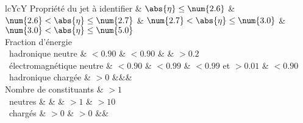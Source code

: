 \begin{tabularx}{\textwidth}{lcYcY}
\toprule
Propriété du jet à identifier & $\abs{\eta}\leq\num{2.6}$ & $\num{2.6}<\abs{\eta}\leq\num{2.7}$ & $\num{2.7}<\abs{\eta}\leq\num{3.0}$ & $\num{3.0}<\abs{\eta}\leq\num{5.0}$ \\
\midrule
Fraction d'énergie\\
\ hadronique neutre & $<\num{0.90}$ & $<\num{0.90}$ &  & $>\num{0.2}$ \\
\ électromagnétique neutre & $<\num{0.90}$ & $<\num{0.99}$ & $<\num{0.99}$ et $>\num{0.01}$ & $<\num{0.90}$ \\
\ hadronique chargée & $>\num{0}$ &&&\\
\midrule
Nombre de constituants & $>\num{1}$\\
\ neutres & & & $>\num{1}$ & $>\num{10}$ \\
\ chargés & $>\num{0}$ & $>\num{0}$ &&\\
\bottomrule
\end{tabularx}
